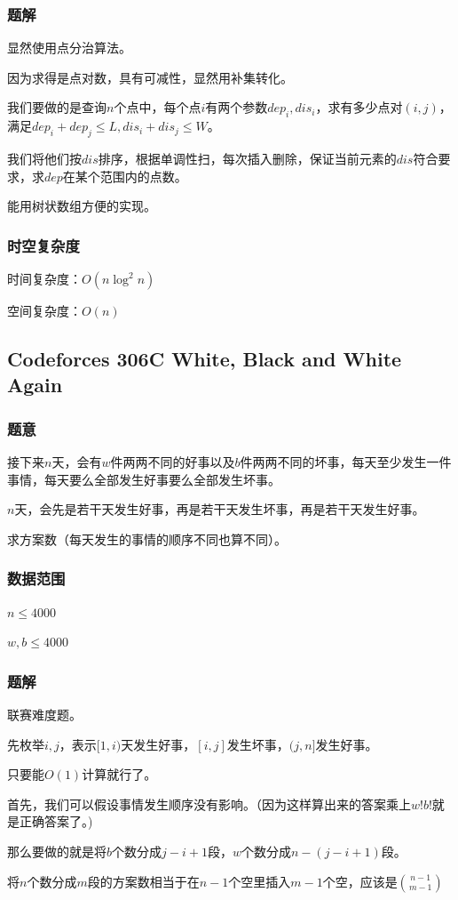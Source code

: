 \documentclass{ctexart}
\begin{document}
\subsubsection{题解}
显然使用点分治算法。

因为求得是点对数，具有可减性，显然用补集转化。

我们要做的是查询$n$个点中，每个点$i$有两个参数$dep_i,dis_i$，求有多少点对$(i,j)$，满足$dep_i+dep_j \le L,dis_i+dis_j \le W$。

我们将他们按$dis$排序，根据单调性扫，每次插入删除，保证当前元素的$dis$符合要求，求$dep$在某个范围内的点数。

能用树状数组方便的实现。
\subsubsection{时空复杂度}
时间复杂度：$O(n \log^2 n)$

空间复杂度：$O(n)$
\subsection{Codeforces 306C White, Black and White Again}
\subsubsection{题意}
接下来$n$天，会有$w$件两两不同的好事以及$b$件两两不同的坏事，每天至少发生一件事情，每天要么全部发生好事要么全部发生坏事。

$n$天，会先是若干天发生好事，再是若干天发生坏事，再是若干天发生好事。

求方案数（每天发生的事情的顺序不同也算不同）。
\subsubsection{数据范围}
$n \le 4000$

$w,b \le 4000$
\subsubsection{题解}
联赛难度题。

先枚举$i,j$，表示$[1,i)$天发生好事，$[i,j]$发生坏事，$(j,n]$发生好事。

只要能$O(1)$计算就行了。

首先，我们可以假设事情发生顺序没有影响。（因为这样算出来的答案乘上$w!b!$就是正确答案了。)

那么要做的就是将$b$个数分成$j-i+1$段，$w$个数分成$n-(j-i+1)$段。

将$n$个数分成$m$段的方案数相当于在$n-1$个空里插入$m-1$个空，应该是${{n-1} \choose {m-1}}$
\end{document}
